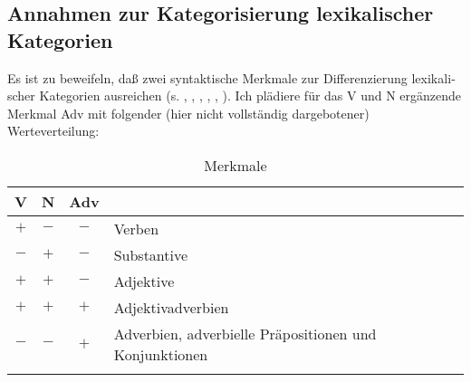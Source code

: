 \documentclass[output=paper, colorlinks, citecolor=brown, booklanguage=german]{langscibook}
\begin{document}
\begin{otherlanguage}{german}
                    
            

\subsection{Annahmen zur Kategorisierung lexikalischer Kategorien} \label{sec:zi97:2.2}

Es ist zu beweifeln, daß zwei syntaktische Merkmale zur Differenzierung lexikalischer Kategorien ausreichen (s. \citealt{zimmermann85}, \citealt{zimmermann87}, \citealt{zimmermann1987zursyntaxvonkomparationskonstruktionen}, \citealt{zimmermann88b}, \citealt{zimmermann88a}, \citealt{zimmermann94}). Ich plädiere für das V und N ergänzende Merkmal Adv mit folgender (hier nicht vollständig dargebotener) Werteverteilung:

\begin{table}[H]
\caption{Merkmale}
\label{tab:zi97:1}
\begin{tabular}{cccl}
\lsptoprule
    V & N & Adv & \\\midrule
    $+$ & $-$ & $-$ & Verben \\
    $-$ & $+$ & $-$ & Substantive \\
    $+$ & $+$ & $-$ & Adjektive \\
    $+$ & $+$ & $+$ & Adjektivadverbien \\
    $-$ & $-$ & $+$ & Adverbien, adverbielle Präpositionen und Konjunktionen \\\lspbottomrule
\end{tabular}
\end{table}


\end{otherlanguage}
\end{document}
